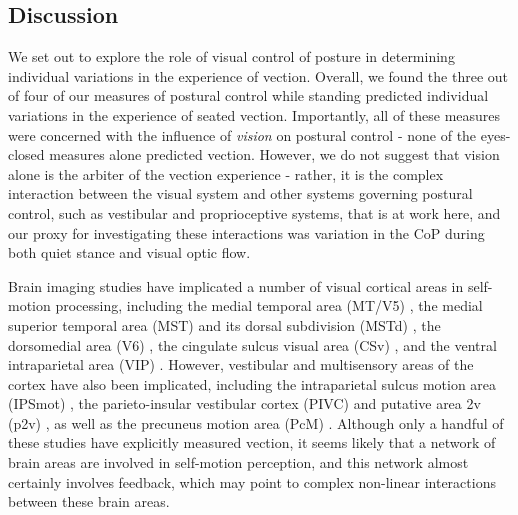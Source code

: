 \documentclass[11pt]{article}
\begin{document}
\begin{linenumbers}
\section*{Discussion}




We set out to explore the role of visual control of posture in determining individual variations in the experience of vection. Overall, we found the three out of four of our measures of postural control while standing predicted individual variations in the experience of seated vection. Importantly, all of these measures were concerned with the influence of \textit{vision} on postural control - none of the eyes-closed measures alone predicted vection. However, we do not suggest that vision alone is the arbiter of the vection experience - rather, it is the complex interaction between the visual system and other systems governing postural control, such as vestibular and proprioceptive systems, that is at work here, and our proxy for investigating these interactions was variation in the CoP during both quiet stance and visual optic flow. 


Brain imaging studies have implicated a number of visual cortical areas in self-motion processing, including the medial temporal area (MT/V5) \cite{Tootell:1995uc}, the medial superior temporal area (MST) \cite{Morrone:2000ht} and its dorsal subdivision (MSTd) \cite{Liu:2009br}, the dorsomedial area (V6) \cite{Cardin:2011id, Pitzalis:2010he}, the cingulate sulcus visual area (CSv) \cite{Wall:2008fw}, and the ventral intraparietal area (VIP) \cite{Pitzalis:2013bp}. However, vestibular and multisensory areas of the cortex have also been implicated, including the intraparietal sulcus motion area (IPSmot) \cite{Pitzalis:2013bp}, the parieto-insular vestibular cortex (PIVC) \cite{Chen:2010du} and putative area 2v (p2v) \cite{Cardin:2010bu}, as well as the precuneus motion area (PcM) \cite{Smith:2011ih}. Although only a handful of these studies have explicitly measured vection, it seems likely that a network of brain areas are involved in self-motion perception, and this network almost certainly involves feedback, which may point to complex non-linear interactions between these brain areas. 


\end{linenumbers}
\end{document}
